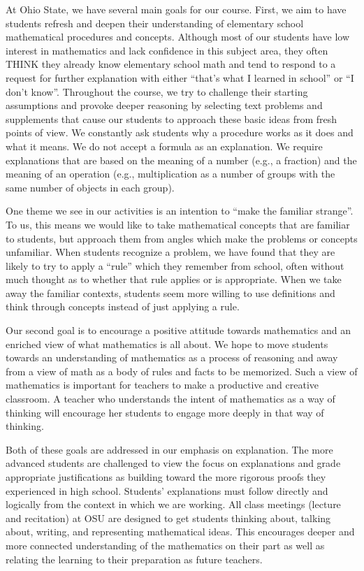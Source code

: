 \documentclass[nooutcomes]{ximera}
\begin{document}
At Ohio State, we have several main goals for our course.  First, we aim to have students refresh and deepen their 
understanding of elementary school mathematical procedures and concepts.  Although most of our 
students have low interest in mathematics and lack confidence in this subject area, they often 
THINK they already know elementary school math and tend to respond to a request 
for further explanation with either ``that's what I learned in school'' or ``I don't know''.  Throughout the 
course, we try to challenge their starting assumptions and provoke deeper reasoning by selecting 
text problems and supplements that cause our students to approach these basic ideas from fresh 
points of view.  We constantly ask students why a procedure works as it does and what it 
means.  We do not accept a formula as an explanation.  We require explanations that are
based on the meaning of a number (e.g., a fraction) and the meaning of an operation (e.g., 
multiplication as a number of groups with the same number of objects in each group).

One theme we see in our activities is an intention to ``make the familiar strange''.  To us, this means 
we would like to take mathematical concepts that are familiar to students, but approach them from 
angles which make the problems or concepts unfamiliar.  When students recognize a problem, we have 
found that they are likely to try to apply a ``rule'' which they remember from school, often 
without much thought as to whether that rule applies or is appropriate.  When we take away the 
familiar contexts, students seem more willing to use definitions and think through concepts instead
of just applying a rule.

Our second goal is to encourage a positive attitude towards mathematics and an enriched view 
of what mathematics is all about.  We hope to move students towards an understanding of mathematics
as a process of reasoning and away from a view of math as a body of 
rules and facts to be memorized. Such a view of mathematics is important for teachers to make a productive and 
creative classroom. A teacher who understands the intent of mathematics as a way of 
thinking will encourage her students to engage more deeply in that way of thinking.  

Both of these goals are addressed in our emphasis on explanation.  The more 
advanced students are challenged to view the focus on explanations and grade appropriate justifications as building toward the more rigorous proofs they experienced in high school.  
Students' explanations must follow directly and logically from the context in which we are working.  
All class meetings (lecture and recitation) at OSU are designed to get students thinking about, talking 
about, writing, and representing mathematical ideas.  This encourages deeper and more connected 
understanding of the mathematics on their part as well as relating the learning to their preparation as future teachers.  
\end{document}
